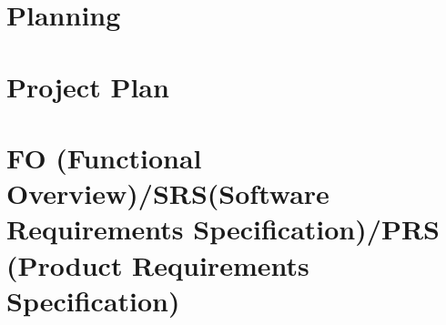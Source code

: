 \appendix

\chapter{Planning}

\chapter{Project Plan}

\chapter{FO (Functional Overview)/SRS(Software Requirements Specification)/PRS (Product Requirements Specification)}